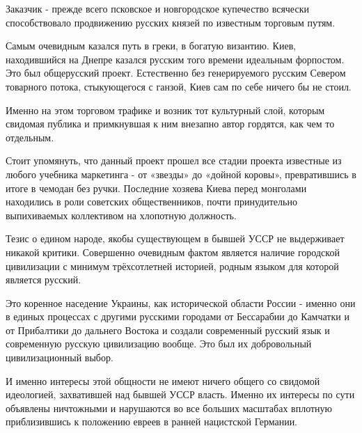 \begin{itemize}
\begin{itemize}
Заказчик - прежде всего псковское и новгородское купечество всячески
способствовало продвижению русских князей по известным торговым путям.

Самым очевидным казался путь в греки, в богатую византию. Киев, находившийся на
Днепре казался русским того времени идеальным форпостом. Это был общерусский
проект. Естественно без генерируемого русским Севером товарного потока,
стыкующегося с ганзой, Киев сам по себе ничего бы не стоил. 

Именно на этом торговом трафике и возник тот культурный слой, которым свидомая
публика и примкнувшая к ним внезапно автор гордятся, как чем то отдельным. 

Стоит упомянуть, что данный проект прошел все стадии проекта известные из
любого учебника маркетинга - от «звезды» до «дойной коровы», превратившись в
итоге в чемодан без ручки. Последние хозяева Киева перед монголами находились в
роли советских общественников, почти принудительно выпихиваемых коллективом на
хлопотную должность.

Тезис о едином народе, якобы существующем в бывшей УССР не выдерживает никакой
критики. Совершенно очевидным фактом является наличие городской цивилизации с
минимум трёхсотлетней историей, родным языком для которой является русский. 

Это коренное наседение Украины, как исторической области России - именно они в
единых процессах с другими русскими городами от Бессарабии до Камчатки и от
Прибалтики до дальнего Востока и создали современный русский язык и современную
русскую цивилизацию вообще. Это был их добровольный цивилизационный выбор. 

И именно интересы этой общности не имеют ничего общего со свидомой идеологией,
захватившей над бывшей УССР власть. Именно их интересы по сути объявлены
ничтожными и нарушаются во все больших масштабах вплотную приблизившись к
положению евреев в ранней нацистской Германии.


\end{itemize}
\end{itemize}
